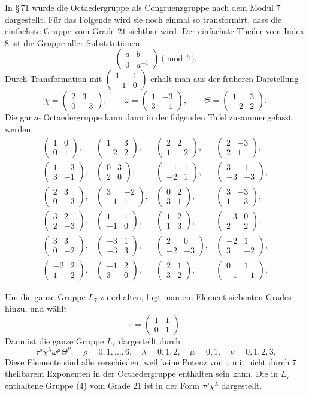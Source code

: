 \documentclass[11pt]{article}
\providecommand{\mat}[4]{\begin{pmatrix}#1&#2\\#3&#4\end{pmatrix}}
\providecommand{\mat}[4]{\begin{pmatrix}#1&#2\\#3&#4\end{pmatrix}}
\providecommand{\mat}[1]{\begin{pmatrix}#1\end{pmatrix}}
\begin{document}
In \S\,71 wurde die Octaedergruppe als Congruenzgruppe nach dem Modul $7$ dargestellt. Für das Folgende wird sie noch einmal so transformirt, dass die einfachste Gruppe vom Grade $21$ sichtbar wird. Der einfachste Theiler vom Index $8$ ist die Gruppe aller Substitutionen
\begin{equation}
 \mat{a}{b}{0}{a^{-1}}\pmod 7.
 \tag{4}
\end{equation}
Durch Transformation mit $\mat{1}{1}{-1}{0}$ erhält man aus der früheren Darstellung
\begin{equation}
 \chi=\mat{2}{3}{0}{-3},\qquad
 \omega=\mat{1}{-3}{3}{-1},\qquad
 \Theta=\mat{1}{3}{-2}{2}.
 \tag{5}
\end{equation}
Die ganze Octaedergruppe kann dann in der folgenden Tafel zusammengefasst werden:
\begin{equation}
\begin{array}{rrrr}
\mat{1}{0}{0}{1},&\mat{1}{3}{-2}{2},&\mat{2}{2}{1}{-2},&\mat{2}{-3}{2}{1},\\[0.7em]
\mat{1}{-3}{3}{-1},&\mat{0}{3}{2}{0},&\mat{-1}{1}{-2}{1},&\mat{3}{1}{-3}{-3},\\[0.7em]
\mat{2}{3}{0}{-3},&\mat{3}{-2}{-1}{1},&\mat{0}{2}{3}{1},&\mat{3}{-3}{1}{-3},\\[0.7em]
\mat{3}{2}{2}{-3},&\mat{1}{1}{-1}{0},&\mat{1}{2}{1}{3},&\mat{-3}{0}{2}{2},\\[0.7em]
\mat{3}{3}{0}{-2},&\mat{-3}{1}{-3}{3},&\mat{2}{0}{-2}{-3},&\mat{-2}{1}{3}{-2},\\[0.7em]
\mat{-2}{2}{1}{2},&\mat{-1}{2}{3}{0},&\mat{2}{1}{3}{2},&\mat{0}{1}{-1}{-1}.
\end{array}
\tag{6}
\end{equation}

Um die ganze Gruppe $L_7$ zu erhalten, fügt man ein Element siebenten Grades hinzu, und wählt
\begin{equation}
 \tau=\mat{1}{1}{0}{1}.
 \tag{7}
\end{equation}
Dann ist die ganze Gruppe $L_7$ dargestellt durch
\begin{equation}
 \tau^{\rho}\chi^{\lambda}\omega^{\mu}\Theta^{\nu},
 \quad \rho=0,1,\ldots,6,
 \quad \lambda=0,1,2,
 \quad \mu=0,1,
 \quad \nu=0,1,2,3.
 \tag{8}
\end{equation}
Diese Elemente sind alle verschieden, weil keine Potenz von $\tau$ mit nicht durch $7$ theilbarem Exponenten in der Octaedergruppe enthalten sein kann. Die in $L_7$ enthaltene Gruppe (4) vom Grade $21$ ist in der Form $\tau^\rho\chi^\lambda$ dargestellt.
\end{document}
